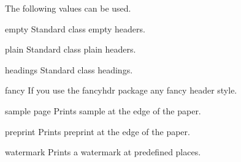 \medskip

 The following values can be used.

\begin{marglist}
\item [empty] Standard class empty headers.
\item [plain] Standard class plain headers.
\item [headings] Standard class headings.
\item [fancy] If you use the fancyhdr package any fancy header style.
\item [sample page] Prints sample at the edge of the paper.
\item [preprint] Prints preprint at the edge of the paper.
\item [watermark] Prints a watermark at predefined places.
\end{marglist}





%
%
%
%


